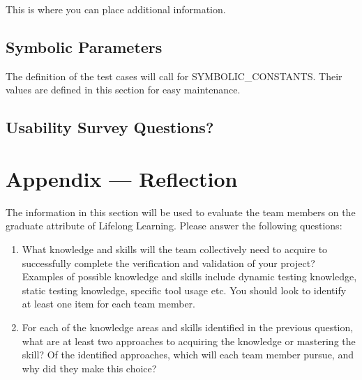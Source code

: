 \documentclass[12pt, titlepage]{article}
\begin{document}
This is where you can place additional information.

\subsection{Symbolic Parameters}

The definition of the test cases will call for SYMBOLIC\_CONSTANTS.
Their values are defined in this section for easy maintenance.

\subsection{Usability Survey Questions?}



\newpage{}
\section*{Appendix --- Reflection}

The information in this section will be used to evaluate the team members on the
graduate attribute of Lifelong Learning.  Please answer the following questions:

\begin{enumerate}
  \item What knowledge and skills will the team collectively need to acquire to
  successfully complete the verification and validation of your project?
  Examples of possible knowledge and skills include dynamic testing knowledge,
  static testing knowledge, specific tool usage etc.  You should look to
  identify at least one item for each team member.
  \item For each of the knowledge areas and skills identified in the previous
  question, what are at least two approaches to acquiring the knowledge or
  mastering the skill?  Of the identified approaches, which will each team
  member pursue, and why did they make this choice?
\end{enumerate}
\end{document}
